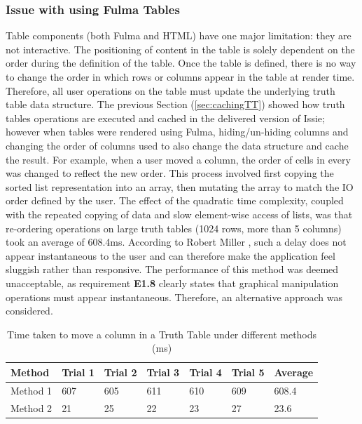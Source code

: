 \subsubsection{Issue with using Fulma Tables}
Table components (both Fulma and HTML) have one major limitation: they are not interactive. The positioning of content in the table is solely dependent on the order during the definition of the table. Once the table is defined, there is no way to change the order in which rows or columns appear in the table at render time. Therefore, all user operations on the table must update the underlying truth table data structure. The previous Section (\ref{sec:cachingTT}) showed how truth tables operations are executed and cached in the delivered version of Issie;  however when tables were rendered using Fulma, hiding/un-hiding columns and changing the order of columns used to also change the  data structure and cache the result. For example, when a user moved a column, the order of cells in every  was changed to reflect the new order. This process involved first copying the sorted list representation into an array, then mutating the array to match the IO order defined by the user. The effect of the quadratic time complexity, coupled with the repeated copying of data and slow element-wise access of lists, was that re-ordering operations on large truth tables (1024 rows, more than 5 columns) took an average of 608.4ms. According to Robert Miller \cite{Miller1968ResponseTI}, such a delay does not appear instantaneous to the user and can therefore make the application feel sluggish rather than responsive. The performance of this method was deemed unacceptable, as requirement \textbf{E1.8} clearly states that graphical manipulation operations must appear instantaneous. Therefore, an alternative approach was considered.

\begin{table}[!ht]
    \centering
    \begin{tabular}{|l|l|l|l|l|l|l|}
    \hline
        Method & Trial 1 & Trial 2 & Trial 3 & Trial 4 & Trial 5 & Average \\ \hline
        Method 1 & 607 & 605 & 611 & 610 & 609 & 608.4 \\ \hline
        Method 2 & 21 & 25 & 22 & 23 & 27 & 23.6 \\ \hline
    \end{tabular}
    \caption{Time taken to move a column in a Truth Table under different methods (ms)}
    \label{tab:colOps}
\end{table}

